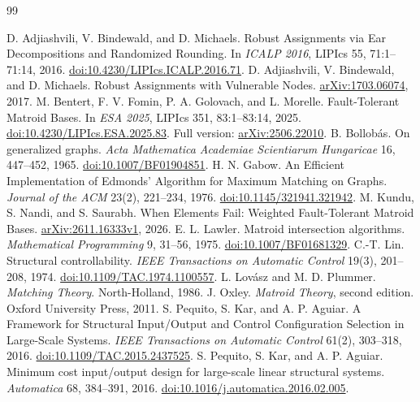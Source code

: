 \documentclass[11pt]{article}
\theoremstyle{definition}
\theoremstyle{remark}\newtheorem{remark}[theorem]{Remark}
\begin{document}
\begin{thebibliography}{99}
\footnotesize
\setlength{\itemsep}{1pt}
\raggedright
{} D. Adjiashvili, V. Bindewald, and D. Michaels.
Robust Assignments via Ear Decompositions and Randomized Rounding.
In \emph{ICALP 2016}, LIPIcs 55, 71:1--71:14, 2016.
\href{https://doi.org/10.4230/LIPIcs.ICALP.2016.71}{doi:10.4230/LIPIcs.ICALP.2016.71}.
 D. Adjiashvili, V. Bindewald, and D. Michaels.
Robust Assignments with Vulnerable Nodes.
\href{https://arxiv.org/abs/1703.06074}{\mbox{arXiv:1703.06074}}, 2017.
 M. Bentert, F. V. Fomin, P. A. Golovach, and L. Morelle.
Fault-Tolerant Matroid Bases. In \emph{ESA 2025}, LIPIcs 351,
83:1--83:14, 2025.
\href{https://doi.org/10.4230/LIPIcs.ESA.2025.83}{doi:10.4230/LIPIcs.ESA.2025.83}.
Full version: \href{https://arxiv.org/abs/2506.22010}{arXiv:2506.22010}.
 B. Bollob\'as. On generalized graphs.
\emph{Acta Mathematica Academiae Scientiarum Hungaricae} 16,
447--452, 1965.
\href{https://doi.org/10.1007/BF01904851}{doi:10.1007/BF01904851}.
 H. N. Gabow.
An Efficient Implementation of Edmonds' Algorithm for Maximum Matching
on Graphs. \emph{Journal of the ACM} 23(2), 221--234, 1976.
\href{https://doi.org/10.1145/321941.321942}{doi:10.1145/321941.321942}.
 M. Kundu, S. Nandi, and S. Saurabh.
When Elements Fail: Weighted Fault-Tolerant Matroid Bases.
\href{https://arxiv.org/abs/2611.16333v1}{arXiv:2611.16333v1}, 2026.
 E. L. Lawler. Matroid intersection algorithms.
\emph{Mathematical Programming} 9, 31--56, 1975.
\href{https://doi.org/10.1007/BF01681329}{doi:10.1007/BF01681329}.
 C.-T. Lin. Structural controllability.
\emph{IEEE Transactions on Automatic Control} 19(3), 201--208, 1974.
\href{https://doi.org/10.1109/TAC.1974.1100557}{doi:10.1109/TAC.1974.1100557}.
 L. Lov\'asz and M. D. Plummer.
\emph{Matching Theory}. North-Holland, 1986.
 J. Oxley. \emph{Matroid Theory}, second edition.
Oxford University Press, 2011.
 S. Pequito, S. Kar, and A. P. Aguiar.
A Framework for Structural Input/Output and Control Configuration Selection
in Large-Scale Systems.
\emph{IEEE Transactions on Automatic Control} 61(2), 303--318, 2016.
\href{https://doi.org/10.1109/TAC.2015.2437525}{doi:10.1109/TAC.2015.2437525}.
 S. Pequito, S. Kar, and A. P. Aguiar.
Minimum cost input/output design for large-scale linear structural systems.
\emph{Automatica} 68, 384--391, 2016.
\href{https://doi.org/10.1016/j.automatica.2016.02.005}{doi:10.1016/j.automatica.2016.02.005}.

\end{thebibliography}
\end{document}
